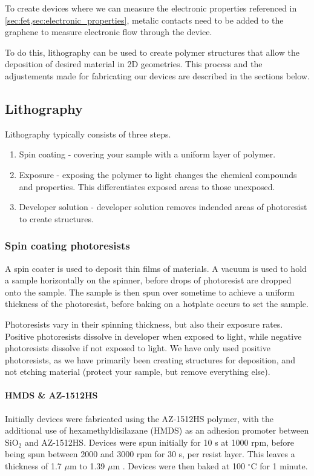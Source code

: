 \documentclass[../../Matt_Gebert_Honours_Thesis.tex]{subfiles}
\begin{document}
	
	
	To create devices where we can measure the electronic properties referenced in \cref{sec:fet,sec:electronic_properties}, metalic contacts need to be added to the graphene to measure electronic flow through the device. 
	
	To do this, lithography can be used to create polymer structures that allow the deposition of desired material in 2D geometries. This process and the adjustements made for fabricating our devices are described in the sections below.
	
	\subsection{Lithography}\label{sec:lithography}
	Lithography typically consists of three steps.
	\begin{enumerate}
		\item Spin coating - covering your sample with a uniform layer of polymer.
		\item Exposure - exposing the polymer to light changes the chemical compounds and properties. This differentiates exposed areas to those unexposed.
		\item Developer solution - developer solution removes indended areas of photoresist to create structures.
	\end{enumerate}
	
	\subsubsection{Spin coating photoresists}\label{sec:resists}
	A spin coater is used to deposit thin films of materials. A vacuum is used to hold a sample horizontally on the spinner, before drops of photoresist are dropped onto the sample. The sample is then spun over sometime to achieve a uniform thickness of the photoresist, before baking on a hotplate occurs to set the sample.
	
	Photoresists vary in their spinning thickness, but also their exposure rates. Positive photoresists dissolve in developer when exposed to light, while negative photoresists dissolve if not exposed to light. We have only used positive photoresists, as we have primarily been creating structures for deposition, and not etching material (protect your sample, but remove everything else).
	
	\paragraph{HMDS \& AZ-1512HS}
	Initially devices were fabricated using the AZ-1512HS polymer, with the additional use of hexamethyldisilazane (HMDS) as an adhesion promoter between SiO$_2$ and AZ-1512HS. Devices were spun initially for 10 s at 1000 rpm, before being spun between 2000 and 3000 rpm for 30 s, per resist layer. This leaves a thickness of 1.7 $\mu$m to 1.39 $\mu$m \cite{az1500_series}.
	Devices were then baked at 100 $^\circ$C for 1 minute.
	
\end{document}
